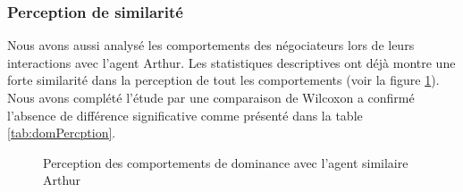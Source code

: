 	\subsubsection{Perception de similarité}
	Nous avons aussi analysé les comportements des négociateurs lors de leurs interactions avec l'agent Arthur. Les statistiques descriptives ont déjà montre une forte similarité dans la perception de tout les comportements (voir la figure \ref{fig:sim}). Nous avons complété l'étude par une comparaison de Wilcoxon a confirmé l'absence de différence significative comme présenté dans la table \ref{tab:domPercption}.  
	\begin{figure}[!tb]
		\centering
		
		\caption{Perception des comportements de dominance avec l'agent similaire Arthur}
		\label{fig:sim}
	\end{figure}
	
